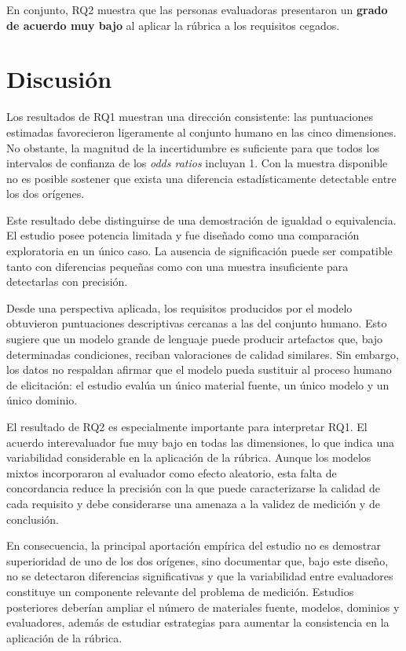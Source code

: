 \documentclass[runningheads]{llncs}
\begin{document}
En conjunto, RQ2 muestra que las personas evaluadoras presentaron un
\textbf{grado de acuerdo muy bajo} al aplicar la r\'ubrica a los requisitos
cegados.

\section{Discusi\'on}
\label{sec:discusion}

Los resultados de RQ1 muestran una direcci\'on consistente: las puntuaciones
estimadas favorecieron ligeramente al conjunto humano en las cinco dimensiones.
No obstante, la magnitud de la incertidumbre es suficiente para que todos los
intervalos de confianza de los \emph{odds ratios} incluyan 1. Con la muestra
disponible no es posible sostener que exista una diferencia estad\'isticamente
detectable entre los dos or\'igenes.

Este resultado debe distinguirse de una demostraci\'on de igualdad o equivalencia.
El estudio posee potencia limitada y fue dise\~nado como una comparaci\'on
exploratoria en un \'unico caso. La ausencia de significaci\'on puede ser
compatible tanto con diferencias peque\~nas como con una muestra insuficiente para
detectarlas con precisi\'on.

Desde una perspectiva aplicada, los requisitos producidos por el modelo obtuvieron
puntuaciones descriptivas cercanas a las del conjunto humano. Esto sugiere que un
modelo grande de lenguaje puede producir artefactos que, bajo determinadas
condiciones, reciban valoraciones de calidad similares. Sin embargo, los datos no
respaldan afirmar que el modelo pueda sustituir al proceso humano de elicitaci\'on:
el estudio eval\'ua un \'unico material fuente, un \'unico modelo y un \'unico
dominio.

El resultado de RQ2 es especialmente importante para interpretar RQ1. El acuerdo
interevaluador fue muy bajo en todas las dimensiones, lo que indica una variabilidad
considerable en la aplicaci\'on de la r\'ubrica. Aunque los modelos mixtos
incorporaron al evaluador como efecto aleatorio, esta falta de concordancia reduce
la precisi\'on con la que puede caracterizarse la calidad de cada requisito y debe
considerarse una amenaza a la validez de medici\'on y de conclusi\'on.

En consecuencia, la principal aportaci\'on emp\'irica del estudio no es demostrar
superioridad de uno de los dos or\'igenes, sino documentar que, bajo este dise\~no,
no se detectaron diferencias significativas y que la variabilidad entre
evaluadores constituye un componente relevante del problema de medici\'on.
Estudios posteriores deber\'ian ampliar el n\'umero de materiales fuente, modelos,
dominios y evaluadores, adem\'as de estudiar estrategias para aumentar la
consistencia en la aplicaci\'on de la r\'ubrica.
\end{document}
